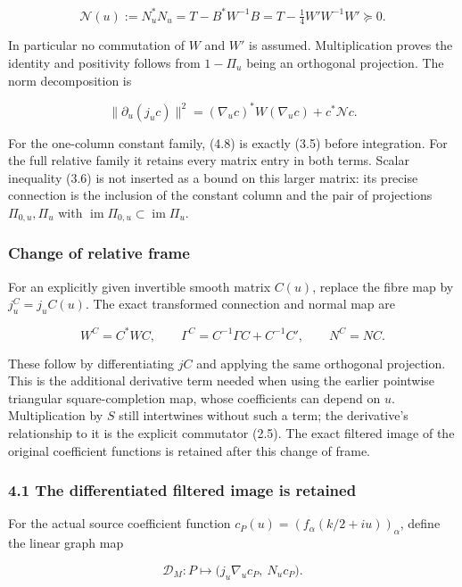 \documentclass[
]{article}
\begin{document}
\[\boxed{\mathcal N(u):=N_u^*N_u=T-B^*W^{-1}B=T-\tfrac14W'W^{-1}W'\succeq0.}\tag{4.7}\]

In particular no commutation of \(W\) and \(W'\) is assumed.
Multiplication proves the identity and positivity follows from
\(1-\Pi_u\) being an orthogonal projection. The norm decomposition is

\[\boxed{\|\partial_u(j_uc)\|^2=(\nabla_uc)^*W(\nabla_uc)+c^*\mathcal N c.}\tag{4.8}\]

For the one-column constant family, (4.8) is exactly (3.5) before
integration. For the full relative family it retains every matrix entry
in both terms. Scalar inequality (3.6) is not inserted as a bound on
this larger matrix: its precise connection is the inclusion of the
constant column and the pair of projections \(\Pi_{0,u},\Pi_u\) with
\(\operatorname{im}\Pi_{0,u}\subset\operatorname{im}\Pi_u\).

\subsubsection{Change of relative frame}\label{change-of-relative-frame}

For an explicitly given invertible smooth matrix \(C(u)\), replace the
fibre map by \(j_u^C=j_uC(u)\). The exact transformed connection and
normal map are

\[W^C=C^*WC,\qquad \Gamma^C=C^{-1}\Gamma C+C^{-1}C',\qquad N^C=NC.\tag{4.12}\]

These follow by differentiating \(jC\) and applying the same orthogonal
projection. This is the additional derivative term needed when using the
earlier pointwise triangular square-completion map, whose coefficients
can depend on \(u\). Multiplication by \(S\) still intertwines without
such a term; the derivative's relationship to it is the explicit
commutator (2.5). The exact filtered image of the original coefficient
functions is retained after this change of frame.

\subsubsection{4.1 The differentiated filtered image is
retained}\label{the-differentiated-filtered-image-is-retained}

For the actual source coefficient function
\(c_P(u)=(f_\alpha(k/2+iu))_\alpha\), define the linear graph map

\[\mathscr D_M:P\longmapsto\bigl(j_u\nabla_uc_P,\ N_uc_P\bigr).\tag{4.9}\]
\end{document}

